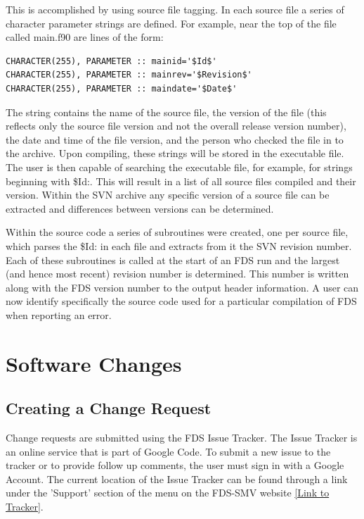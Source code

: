 \documentclass[11pt]{book}
\begin{document}
This is accomplished by using source file tagging.  In each source file a series of character parameter
strings are defined.  For example, near the top of the file called main.f90 are lines of the form:

\footnotesize
\begin{verbatim}
CHARACTER(255), PARAMETER :: mainid='$Id$'
CHARACTER(255), PARAMETER :: mainrev='$Revision$'
CHARACTER(255), PARAMETER :: maindate='$Date$'
\end{verbatim} \normalsize

\noindent
The string contains the name of the source file, the version of the file (this reflects only the source
file version and not the overall release version number), the date and time of the file version, and
the person who checked the file in to the archive.  Upon compiling, these strings will be stored in the
executable file.  The user is then capable of searching the executable file, for example, for strings
beginning with {\ct \$Id:}.  This will result in a list of all source files compiled and their version.
Within the SVN archive any specific version of a source file can be extracted and differences between
versions can be determined.

Within the source code a series of subroutines were created, one per source file, which parses the {\ct \$Id:} in
each file and extracts from it the SVN revision number.  Each of these subroutines is called at the start
of an FDS run and the largest (and hence most recent) revision number is determined.  This number is written
along with the FDS version number to the output header information.  A user can now identify specifically
the source code used for a particular compilation of FDS when reporting an error.


\section{Software Changes}

\subsection{Creating a Change Request}

Change requests are submitted using the FDS Issue Tracker.  The Issue Tracker is an online service that is part of
Google Code.  To submit a new issue to the tracker or to provide follow up comments, the user must sign in with a Google Account.
The current location of the Issue Tracker can be found through a link under the 'Support' section of the menu
on the FDS-SMV website \href{http://code.google.com/p/fds-smv/issues/list}{[Link to Tracker]}.
\end{document}
